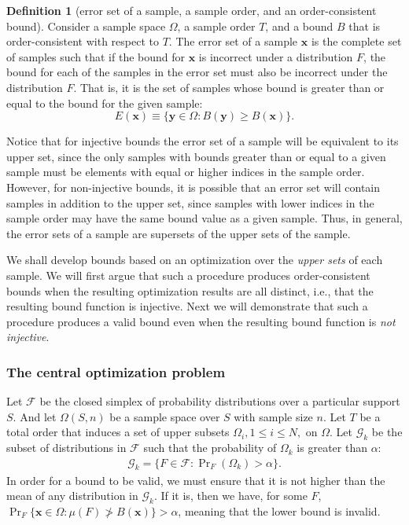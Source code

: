 \documentclass{article}
\theoremstyle{definition}
\newtheorem{definition}{Definition}[section]
\theoremstyle{remark}
\newcommand{\y}{\mathbf{y}}
\def\y{\mathbf{y}}
\def\x{\mathbf{x}}
\begin{document}
\begin{definition}[error set of a sample, a sample order, and an order-consistent bound]
Consider a sample space $\Omega$, a sample order $T$, and a bound $B$ that is order-consistent with respect to $T$. The error set of a sample $\x$ is the complete set of samples such that if the bound for $\x$ is incorrect under a distribution $F$, the bound for each of the samples in the error set must also be incorrect under the distribution $F$. That is, it is the set of samples whose bound is greater than or equal to the bound for the given sample:
$$
E(\x) \equiv \{\y\in \Omega: B(\y)\geq B(\x)\}.$$
\end{definition}

Notice that for injective bounds the error set of a sample will be equivalent to its upper set, since the only samples with bounds greater than or equal to a given sample must be elements with equal or higher indices in the sample order.  However, for non-injective bounds, it is possible that an error set will contain samples in addition to the upper set, since samples with lower indices in the sample order may have the same bound value as a given sample.  Thus, in general, the error sets of a sample are supersets of the upper sets of the sample.

We shall develop bounds based on an optimization over the {\em upper sets} of each sample. We will first argue that such a procedure produces order-consistent bounds when the resulting optimization results are all distinct, i.e., that the resulting bound function is injective. Next we will demonstrate that such a procedure produces a valid bound even when the resulting bound function is {\em not injective}. 

\subsubsection{The central optimization problem}
Let $\mathcal{F}$ be the closed simplex of probability distributions over a particular support $S$. And let $\Omega(S,n)$ be a sample space over $S$ with sample size $n$. Let $T$ be a total order that induces a set of upper subsets $\Omega_i, 1\leq i \leq N,$ on $\Omega$. Let $\mathcal{G}_k$ be the subset of distributions in $\mathcal{F}$ such that the probability of $\Omega_k$ is greater than $\alpha$:
\begin{eqnarray}
\label{eq:gk}
\mathcal{G}_k = \{F \in \mathcal{F}: \Pr\nolimits_F(\Omega_k)  > \alpha\}.
\end{eqnarray}
In order for a bound to be valid, we must ensure that it is not higher than the mean of any distribution in $\mathcal{G}_k$. If it is, then we have, for some $F$, $\Pr_F\{\x \in \Omega: \mu(F) \ngtr B(\x)\} > \alpha$, meaning that the lower bound is invalid.
\end{document}
